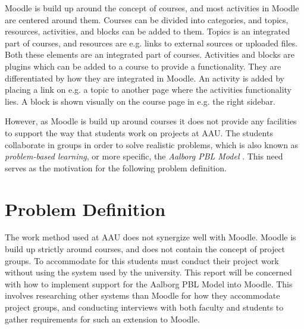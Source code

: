 Moodle is build up around the concept of courses, and most activities in Moodle are centered around them. 
Courses can be divided into categories, and topics, resources, activities, and blocks can be added to them. 
Topics is an integrated part of courses, and resources are e.g. links to external sources or uploaded files. 
Both these elements are an integrated part of courses. Activities and blocks are plugins which can be added to a course to provide a functionality. They are differentiated by how they are integrated in Moodle. An activity is added by placing a link on e.g. a topic to another page where the activities functionality lies. A block is shown visually on the course page in e.g. the right sidebar. 


However, as Moodle is build up around courses it does not provide any facilities to support the way that students work on projects at AAU. The students collaborate in groups in order to solve realistic problems, which is also known as \emph{problem-based learning}, or more specific, the \emph{Aalborg PBL Model} \citep{pbl}. This need serves as the motivation for the following problem definition.

\section{Problem Definition}
\label{sec:problemDef}
The work method used at AAU does not synergize well with Moodle. Moodle is build up strictly around courses, and does not contain the concept of project groups. To accommodate for this students must conduct their project work without using the system used by the university. This report will be concerned with how to implement support for the Aalborg PBL Model into Moodle. This involves researching other systems than Moodle for how they accommodate project groups, and conducting interviews with both faculty and students to gather requirements for such an extension to Moodle.